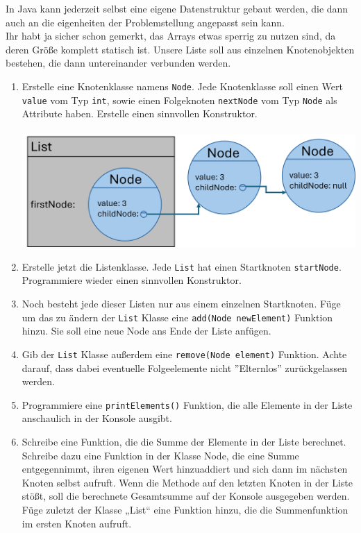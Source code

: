 \documentclass{../../sheet}
\begin{document}
\newpage
{}
In Java kann jederzeit selbst eine eigene Datenstruktur gebaut werden, die dann auch an die eigenheiten der Problemstellung angepasst sein kann. \\
Ihr habt ja sicher schon gemerkt, das Arrays etwas sperrig zu nutzen sind, da deren Größe komplett statisch ist. Unsere Liste soll aus einzelnen Knotenobjekten bestehen, die dann untereinander verbunden werden.
\begin{enumerate}
    \item Erstelle eine Knotenklasse namens \texttt{Node}. Jede Knotenklasse soll einen Wert \texttt{value} vom Typ \texttt{int}, sowie einen Folgeknoten \texttt{nextNode} vom Typ \texttt{Node} als Attribute haben. Erstelle einen sinnvollen Konstruktor.\\\\
          \includegraphics[width=\linewidth]{img/linkedlist.png}
    \item Erstelle jetzt die Listenklasse. Jede \texttt{List} hat einen Startknoten \texttt{startNode}. Programmiere wieder einen sinnvollen Konstruktor.
    \item Noch besteht jede dieser Listen nur aus einem einzelnen Startknoten. Füge um das zu ändern der \texttt{List} Klasse eine \texttt{add(Node newElement)} Funktion hinzu. Sie soll eine neue Node ans Ende der Liste anfügen.
    \item Gib der \texttt{List} Klasse außerdem eine \texttt{remove(Node element)} Funktion. Achte darauf, dass dabei eventuelle Folgeelemente nicht ''Elternlos'' zurückgelassen werden.
    \item Programmiere eine \texttt{printElements()} Funktion, die alle Elemente in der Liste anschaulich in der Konsole ausgibt.
    \item Schreibe eine Funktion, die die Summe der Elemente in der Liste berechnet. Schreibe dazu eine Funktion in der Klasse Node, die eine Summe entgegennimmt, ihren eigenen Wert hinzuaddiert und sich dann im nächsten Knoten selbst aufruft. Wenn die Methode auf den letzten Knoten in der Liste stößt, soll die berechnete Gesamtsumme auf der Konsole ausgegeben werden. Füge zuletzt der Klasse „List“ eine Funktion hinzu, die die Summenfunktion im ersten Knoten aufruft.
\end{enumerate}
\end{document}
